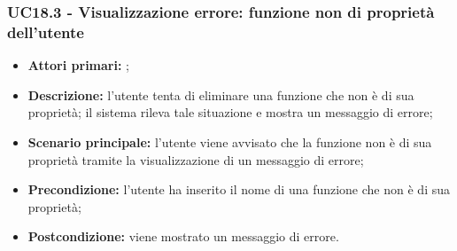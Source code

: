 \subsubsection{UC18.3 - Visualizzazione errore: funzione non di proprietà dell’utente}
\begin{itemize}
	\item \textbf{Attori primari:} \us{};
	\item \textbf{Descrizione:} l’utente tenta di eliminare una funzione che non è di sua proprietà; il sistema rileva tale situazione e mostra un messaggio di errore;
	\item \textbf{Scenario principale:} l’utente viene avvisato che la funzione non è di sua proprietà tramite la visualizzazione di un messaggio di errore;  
	\item \textbf{Precondizione:} l’utente ha inserito il nome di una funzione che non è di sua proprietà;  
	\item \textbf{Postcondizione:} viene mostrato un messaggio di errore.
\end{itemize}